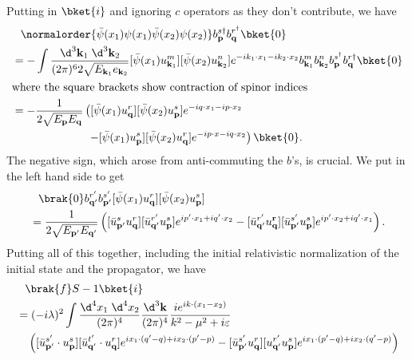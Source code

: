 \documentclass[a4paper]{article}
\begin{document}
\begin{eg}
  Putting in $\bket{i}$ and ignoring $c$ operators as they don't contribute, we have
  \begin{align*}
    &\hphantom{=}\normalorder{\bar\psi(x_1)\psi(x_1) \bar\psi(x_2) \psi(x_2)} b_\mathbf{p}^{s\dagger}b_{\mathbf{q}}^{r^\dagger}\bket{0}\\
    &= -\int \frac{\d^3 \mathbf{k}_1\;\d^3 \mathbf{k}_2}{(2\pi)^6 2\sqrt{E_{\mathbf{k}_1}e_{\mathbf{k}_2}}} [\bar\psi (x_1) u_{\mathbf{k}_1}^m] [\bar\psi(x_2) u_{\mathbf{k}_2}^n] e^{-ik_1 \cdot x_1 - i k_2 \cdot x_2} b_{\mathbf{k}_1}^m b_{\mathbf{k}_2}^n b_{\mathbf{p}}^{s^\dagger} b_\mathbf{q}^{r\dagger}\bket{0}\\
    \intertext{where the square brackets show contraction of spinor indices}
    &= -\frac{1}{2\sqrt{E_\mathbf{p} E_\mathbf{q}}} \left([\bar\psi(x_1) u_\mathbf{q}^r] [\bar\psi(x_2) u_\mathbf{p}^s] e^{-iq\cdot x_1 - ip\cdot x_2}\right. \\
    &\hphantom{= -\frac{1}{2\sqrt{E_\mathbf{p} E_\mathbf{q}}} \Big(}\left.- [\bar\psi(x_1) u_\mathbf{p}^s][\bar\psi(x_2) u_\mathbf{q}^r] e^{-ip\cdot x - iq\cdot x_2}\right)\bket{0}.
  \end{align*}
  The negative sign, which arose from anti-commuting the $b$'s, is crucial. We put in the left hand side to get
  \begin{align*}
    &\hphantom{=}\brak{0}b_{\mathbf{q}'}^{r'} b_{\mathbf{p}'}^{s'} [\bar\psi(x_1) u_\mathbf{q}^r][\bar\psi(x_2) u_\mathbf{p}^s]\\
    &= \frac{1}{2\sqrt{E_{\mathbf{p}'} E_{\mathbf{q}'}}} \left([\bar u_{\mathbf{p}'}^s u_\mathbf{q}^r][\bar u_{\mathbf{q}'}^{r'} u_\mathbf{p}^s] e^{ip'\cdot x_1 + i q'\cdot x_2} -[\bar{u}_{\mathbf{q}'}^{r'} u_\mathbf{q}^\mathbf{r}][\bar u_{\mathbf{p}'}^{s'} u_{\mathbf{p}}^s] e^{ip'\cdot x_2 + i q'\cdot x_1}\right).
  \end{align*}
  Putting all of this together, including the initial relativistic normalization of the initial state and the propagator, we have
  \begin{align*}
    &\hphantom{=}\brak{f}S - 1\bket{i} \\
    &= (-i\lambda)^2 \int \frac{\d^4 x_1 \; \d^4 x_2}{(2\pi)^4} \frac{\d^3 \mathbf{k}}{(2\pi)^4} \frac{ie^{ik\cdot (x_1 - x_2)}}{k^2 - \mu^2 + i \varepsilon}\\
    &\quad\left([\bar u_{\mathbf{p}'}^{s'} \cdot u_{\mathbf{p}}^s][\bar u_{\mathbf{q}'}^{t'} \cdot u_\mathbf{q}^r] e^{i x_1 \cdot (q' - q) + i x_2 \cdot (p' - p)} - [\bar{u}_{\mathbf{p}'}^{s'}u_\mathbf{q}^r][u_{\mathbf{q}'}^{r'} u_\mathbf{p}^s] e^{ix_1 \cdot (p' - q) + i x_2 \cdot (q' - p)}\right)\\

\end{align*}
\end{eg}
\end{document}
